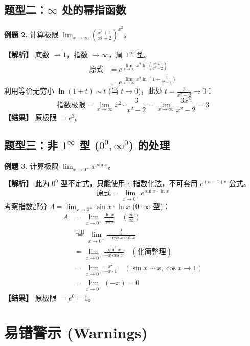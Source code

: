 \documentclass[12pt, a4paper]{article}
\begin{document}
\subsection*{题型二：$\infty$ 处的幂指函数}
\textbf{例题 2.} 计算极限 $\displaystyle \lim_{x \to \infty} \left( \frac{x^2+1}{x^2-2} \right)^{x^2}$。

\noindent\textbf{【解析】}
底数 $\to 1$，指数 $\to \infty$，属 $1^\infty$ 型。
\begin{align*}
    \text{原式} &= e^{\lim_{x \to \infty} x^2 \ln \left( \frac{x^2+1}{x^2-2} \right)} \\
    &= e^{\lim_{x \to \infty} x^2 \ln \left( 1 + \frac{3}{x^2-2} \right)} 
\end{align*}
利用等价无穷小 $\ln(1+t) \sim t$ (当 $t \to 0$)，此处 $t = \frac{3}{x^2-2} \to 0$：
\[
    \text{指数极限} = \lim_{x \to \infty} x^2 \cdot \frac{3}{x^2-2} = \lim_{x \to \infty} \frac{3x^2}{x^2-2} = 3
\]
\textbf{【结果】} 原极限 $= e^3$。

\newpage

\subsection*{题型三：非 $1^\infty$ 型 ($0^0, \infty^0$) 的处理}
\textbf{例题 3.} 计算极限 $\displaystyle \lim_{x \to 0^+} x^{\sin x}$。

\noindent\textbf{【解析】}
此为 $0^0$ 型不定式，\textbf{只能}使用 $e$ 指数化法，不可套用 $e^{(u-1)v}$ 公式。
\[
    \text{原式} = \lim_{x \to 0^+} e^{\sin x \cdot \ln x}
\]
考察指数部分 $A = \lim_{x \to 0^+} \sin x \cdot \ln x$ ($0 \cdot \infty$ 型)：
\begin{align*}
    A &= \lim_{x \to 0^+} \frac{\ln x}{\frac{1}{\sin x}} \quad \left(\frac{\infty}{\infty}\right) \\
    &\overset{\text{L'H}}{=} \lim_{x \to 0^+} \frac{\frac{1}{x}}{-\csc x \cot x} \\
    &= \lim_{x \to 0^+} \frac{\sin^2 x}{-x \cos x} \quad (\text{化简整理}) \\
    &= \lim_{x \to 0^+} \frac{x^2}{-x \cdot 1} \quad (\sin x \sim x, \cos x \to 1) \\
    &= \lim_{x \to 0^+} (-x) = 0
\end{align*}
\textbf{【结果】} 原极限 $= e^0 = 1$。

\section{易错警示 (Warnings)}
\end{document}
